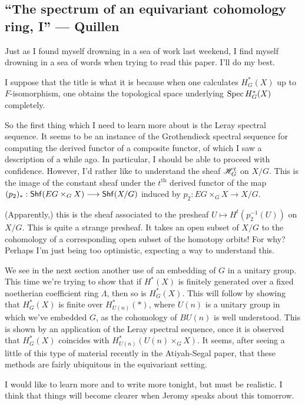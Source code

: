 \documentclass[11pt]{article}
\newcommand{\KanSemResponse}[1]
{
\thispagestyle{fancy}
\subsection*{#1}
}
\begin{document}
\begin{QuillenSpectrumOfEqCohomology}
\KanSemResponse
{``The spectrum of an equivariant cohomology ring, I'' --- Quillen}
Just as I found myself drowning in a sea of work last weekend, I find myself drowning in a sea of words when trying to read this paper. I'll do my best.

I suppose that the title is what it is because when one calculates $H^*_G(X)$ up to $F$-isomorphism, one obtains the topological space underlying $\operatorname{Spec} H^*_G(X)$ completely.

So the first thing which I need to learn more about is the Leray spectral sequence. It seems to be an instance of the Grothendieck spectral sequence for computing the derived functor of a composite functor, of which I saw a description of a while ago. In particular, I should be able to proceed with confidence. However, I'd rather like to understand the sheaf $\mathscr{H}_G^t$ on $X/G$. This is the image of the constant sheaf under the $t^\text{th}$ derived functor of the map $(p_2)_*:\operatorname{{\mathsf{Shf}}}(EG\times_G X)\longrightarrow \operatorname{{\mathsf{Shf}}}(X/G)$ induced by $p_2:EG\times_G X\to X/G$.

(Apparently,) this is the sheaf associated to the presheaf $U\mapsto H^t(p_2^{-1}(U))$ on $X/G$. This is quite a strange presheaf. It takes an open subset of $X/G$ to the cohomology of a corresponding open subset of the homotopy orbits! For why? Perhaps I'm just being too optimistic, expecting a way to understand this.

We see in the next section another use of an embedding of $G$ in a unitary group. This time we're trying to show that if $H^*(X)$ is finitely generated over a fixed noetherian coefficient ring $\Lambda$, then so is $H^*_G(X)$. This will follow by showing that $H^*_G(X)$ is finite over  $H^*_{U(n)}(\ast)$, where $U(n)$ is a unitary group in which we've embedded $G$, as the cohomology of $BU(n)$ is well understood. This is shown by an application of the Leray spectral sequence, once it is observed that $H^*_G(X)$ coincides with $H^*_{U(n)}(U(n)\times_G X)$. It seems, after seeing a little of this type of material recently in the Atiyah-Segal paper, that these methods are fairly ubiquitous in the equivariant setting.

I would like to learn more and to write more tonight, but must be realistic. I think that things will become clearer when Jeromy speaks about this tomorrow.

\pagebreak
\end{QuillenSpectrumOfEqCohomology}
\end{document}

